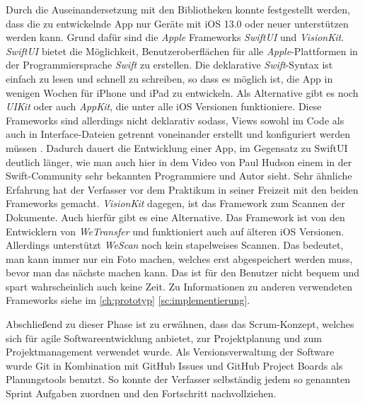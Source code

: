 \documentclass[notables, nomenclature, oneside, 150]{HSMW-Thesis}
\begin{document}
		Durch die Auseinandersetzung mit den Bibliotheken konnte festgestellt werden, dass die zu entwickelnde App nur Geräte mit iOS 13.0 oder neuer unterstützen werden kann. Grund dafür sind die \textit{Apple} Frameworks \textit{SwiftUI} und \textit{VisionKit}. \textit{SwiftUI} bietet die Möglichkeit, Benutzeroberflächen für alle \textit{Apple}-Plattformen in der Programmiersprache \textit{Swift} zu erstellen. Die deklarative \textit{Swift}-Syntax ist einfach zu lesen und schnell zu schreiben, so dass es möglich ist, die App in wenigen Wochen für iPhone und iPad zu entwickeln. Als Alternative gibt es noch \textit{UIKit} oder auch \textit{AppKit}, die unter alle iOS Versionen funktioniere. Diese Frameworks sind allerdings nicht deklarativ sodass, Views sowohl im Code als auch in Interface-Dateien getrennt voneinander erstellt und konfiguriert werden müssen \cite{sillmann_einstieg_2019}. Dadurch dauert die Entwicklung einer App, im Gegensatz zu SwiftUI deutlich länger, wie man auch hier in dem Video von Paul Hudson einem in der Swift-Community sehr bekannten Programmiere und Autor sieht. Sehr ähnliche Erfahrung hat der Verfasser vor dem Praktikum in seiner Freizeit mit den beiden Frameworks gemacht. \textit{VisionKit} dagegen, ist das Framework zum Scannen der Dokumente. Auch hierfür gibt es eine Alternative. Das Framework ist von den Entwicklern von \textit{WeTransfer} und funktioniert auch auf älteren iOS Versionen. Allerdings unterstützt \textit{WeScan} noch kein stapelweises Scannen. Das bedeutet, man kann immer nur ein Foto machen, welches erst abgespeichert werden muss, bevor man das nächste machen kann. Das ist für den Benutzer nicht bequem und spart wahrscheinlich auch keine Zeit. Zu Informationen zu anderen verwendeten Frameworks siehe im \autoref{ch:prototyp} \autoref{sc:implementierung}.

		Abschließend zu dieser Phase ist zu erwähnen, dass das Scrum-Konzept, welches sich für agile Softwareentwicklung anbietet, zur Projektplanung und zum Projektmanagement verwendet wurde. Als Versionsverwaltung der Software wurde Git in Kombination mit GitHub Issues und GitHub Project Boards als Planungstools benutzt. So konnte der Verfasser selbständig jedem so genannten Sprint Aufgaben zuordnen und den Fortschritt nachvollziehen.
\end{document}
